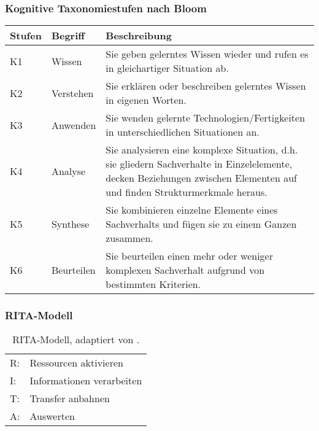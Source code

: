 \documentclass[
11pt,
captions=tableheading,
headsepline,
footsepline, 
captions=tableheading,
parskip=half-,
]{scrartcl}
\begin{document}
\subsubsection{Kognitive Taxonomiestufen nach Bloom}

\begin{table}[H]
    \centering
    \label{tab:Bloom}
    \caption{Kognitive Taxonomiestufen nach Bloom \cite{bloom1956taxonomy}, adaptiert von \cite{BerufspädagogischesKonzept_BauschuleAarau}.}
    \begin{longtable}{@{}llp{12cm}@{}}
        \toprule
        \textbf{Stufen} & \textbf{Begriff} & \textbf{Beschreibung} \\ 
        \midrule
        K1 & Wissen & Sie geben gelerntes Wissen wieder und rufen es in gleichartiger Situation ab. \\ 
        K2 & Verstehen & Sie erklären oder beschreiben gelerntes Wissen in eigenen Worten. \\ 
        K3 & Anwenden & Sie wenden gelernte Technologien/Fertigkeiten in unterschiedlichen Situationen an. \\ 
        K4 & Analyse & Sie analysieren eine komplexe Situation, d.h. sie gliedern Sachverhalte in Einzelelemente, decken Beziehungen zwischen Elementen auf und finden Strukturmerkmale heraus. \\ 
        K5 & Synthese & Sie kombinieren einzelne Elemente eines Sachverhalts und fügen sie zu einem Ganzen zusammen. \\ 
        K6 & Beurteilen & Sie beurteilen einen mehr oder weniger komplexen Sachverhalt aufgrund von bestimmten Kriterien. \\ 
        \bottomrule
    \end{longtable}
\end{table}




\subsubsection{RITA-Modell}
\begin{table}[H]
    \centering
    \label{tab:RITA_Modell}
    \caption{RITA-Modell, adaptiert von \cite{BerufspädagogischesKonzept_BauschuleAarau}.}
    \begin{tabularx}{\textwidth}{@{}Xp{11cm}@{}}
    \toprule
    R:  & Ressourcen aktivieren \\
    I: & Informationen verarbeiten \\
    T: & Transfer anbahnen \\
    A: & Auswerten \\
    \bottomrule
    \end{tabularx}
    \end{table}
\end{document}
